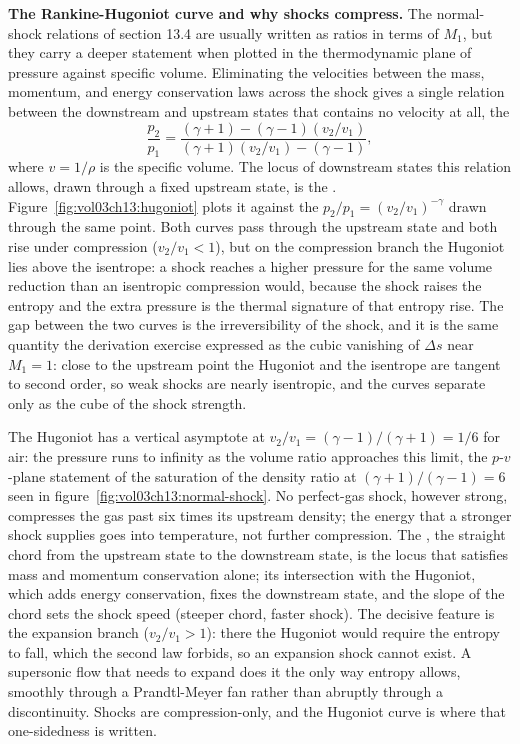 \begin{mastery}
\textbf{The Rankine-Hugoniot curve and why shocks compress.} The
normal-shock relations of section 13.4 are usually written as ratios in
terms of $M_1$, but they carry a deeper statement when plotted in the
thermodynamic plane of pressure against specific volume. Eliminating
the velocities between the mass, momentum, and energy conservation laws
across the shock gives a single relation between the downstream and
upstream states that contains no velocity at all, the
\[
\frac{p_2}{p_1} = \frac{(\gamma + 1) - (\gamma - 1)(v_2/v_1)}
{(\gamma + 1)(v_2/v_1) - (\gamma - 1)},
\]
where $v = 1/\rho$ is the specific volume. The locus of downstream
states this relation allows, drawn through a fixed upstream state, is
the . Figure~\ref{fig:vol03ch13:hugoniot} plots
it against the  $p_2/p_1 = (v_2/v_1)^{-\gamma}$ drawn
through the same point. Both curves pass through the upstream state and
both rise under compression ($v_2/v_1 < 1$), but on the compression
branch the Hugoniot lies above the isentrope: a shock reaches a higher
pressure for the same volume reduction than an isentropic compression
would, because the shock raises the entropy and the extra pressure is
the thermal signature of that entropy rise. The gap between the two
curves is the irreversibility of the shock, and it is the same
quantity the derivation exercise expressed as the cubic vanishing of
$\Delta s$ near
$M_1 = 1$: close to the upstream point the Hugoniot and the isentrope
are tangent to second order, so weak shocks are nearly isentropic, and
the curves separate only as the cube of the shock strength.

The Hugoniot has a vertical asymptote at
$v_2/v_1 = (\gamma - 1)/(\gamma + 1) = 1/6$ for air: the pressure runs
to infinity as the volume ratio approaches this limit, the
$p$-$v$-plane statement of the saturation of the density ratio at
$(\gamma + 1)/(\gamma - 1) = 6$ seen in
figure~\ref{fig:vol03ch13:normal-shock}. No perfect-gas shock,
however strong, compresses the gas past six times its upstream density;
the energy that a stronger shock supplies goes into temperature, not
further compression. The , the straight chord
from the upstream state to the downstream state, is the locus that
satisfies mass and momentum conservation alone; its intersection with
the Hugoniot, which adds energy conservation, fixes the downstream
state, and the slope of the chord sets the shock speed (steeper chord,
faster shock). The decisive feature is the expansion branch
($v_2/v_1 > 1$): there the Hugoniot would require the entropy to fall,
which the second law forbids, so an expansion shock cannot exist. A
supersonic flow that needs to expand does it the only way entropy
allows, smoothly through a Prandtl-Meyer fan rather than abruptly
through a discontinuity. Shocks are compression-only, and the Hugoniot
curve is where that one-sidedness is written.
\end{mastery}

